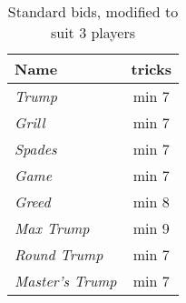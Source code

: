 %
%
%

\begin{table}
	\begin{center}
		\begin{tabular}{ l | c }
				\textbf{Name} & \textbf{tricks}
				\\ \hline
				\textit{Trump} & min 7 \\
				\textit{Grill} & min 7 \\
				\textit{Spades} & min 7 \\
				\textit{Game} & min 7 \\
				\textit{Greed} & min 8 \\
				\textit{Max Trump} & min 9 \\
				\textit{Round Trump} & min 7 \\
				\textit{Master's Trump} & min 7
		\end{tabular}
	\end{center}
	\caption{Standard bids, modified to suit 3 players}
	\label{tab:standardBids3}
\end{table}
